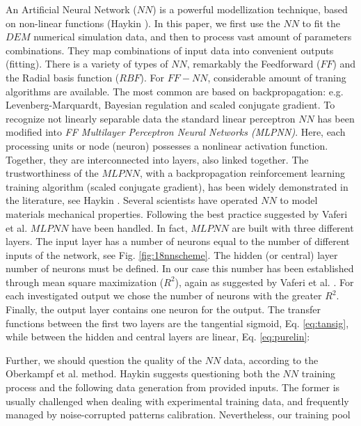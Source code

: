 An Artificial Neural Network ($NN$) is a powerful modellization technique, 
based on non-linear functions (Haykin \cite{RefWorks:158}). 
In this paper, we first use the $NN$ to fit the $DEM$ numerical simulation data, 
and then to process vast amount of parameters combinations. 
They map combinations of input data into convenient outputs (fitting). 
There is a variety of types of $NN$, remarkably the Feedforward ($FF$) 
and the Radial basis function ($RBF$). For $FF-NN$, considerable amount 
of traning algorithms are available. The most common are based on backpropagation: 
e.g. Levenberg-Marquardt, Bayesian regulation and scaled conjugate gradient. 
To recognize not linearly separable data the standard linear perceptron $NN$ 
has been modified into \textit{FF Multilayer Perceptron Neural Networks (MLPNN)}. 
Here, each processing units or node (neuron) possesses a nonlinear activation function. 
Together, they are interconnected into layers, also linked together. 
The trustworthiness of the $MLPNN$, with a backpropagation reinforcement learning 
training algorithm (scaled conjugate gradient), has been widely demonstrated in the 
literature, see Haykin \cite{RefWorks:158}. Several scientists 
\cite{RefWorks:161, RefWorks:166, RefWorks:167, RefWorks:168, RefWorks:169, RefWorks:170} 
have operated $NN$ to model materials mechanical properties. 
Following the best practice suggested by Vaferi et al. \cite{RefWorks:150} $MLPNN$ have been handled.
In fact, $MLPNN$ are built with three different layers. 
The input layer has a number of neurons equal to the number of different inputs
of the network, see Fig. \ref{fig:18nnscheme}.
The hidden (or central) layer number of neurons must be defined. 
In our case this number has been established through mean square maximization ($R^2$), 
again as suggested by Vaferi et al. \cite{RefWorks:150}. 
For each investigated output we chose the number of neurons with the greater $R^2$.
Finally, the output layer contains one neuron for the output.
The transfer functions between the first two layers are the tangential sigmoid, Eq. \ref{eq:tansig}, 
while between the hidden and central layers are linear, Eq. \ref{eq:purelin}:


Further, we should question the quality of the $NN$ data, according to the 
Oberkampf et al. \cite{RefWorks:160} method. Haykin \cite{RefWorks:158} 
suggests questioning both the $NN$ training process and the following data
generation from provided inputs.
The former is usually challenged when dealing with experimental training data, and frequently 
managed by noise-corrupted patterns calibration. Nevertheless, our training pool
